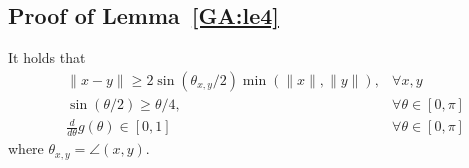 \subsection{Proof of Lemma~\ref{GA:le4}}

It holds that
\begin{align}
&\|x - y\| \geq 2 \sin (\theta_{x, y} / 2) \min(\|x\|, \|y\|), &\forall x, y \label{GA:e4} \\
&\sin(\theta / 2) \geq \theta / 4, &\forall \theta \in [0, \pi] \label{GA:e5} \\
&\frac{d}{d \theta} g(\theta) \in [0, 1] &\forall \theta \in [0, \pi] \label{GA:e13} %
\end{align}
where $\theta_{x, y} = \angle(x, y)$.

